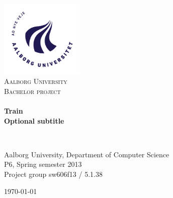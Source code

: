 \begin{titlingpage}
\begin{center}
\includegraphics[width=0.30\textwidth]{img/Titelblad/AAU_logo_2012}~\\[0.5cm]

\textsc{\LARGE Aalborg University}\\[0.5cm]

\textsc{\Large Bachelor project}\\[0.5cm]

\HRule \\[0.4cm]
{ \huge \bfseries Train}\\[0.4cm]
{ \bfseries Optional subtitle}

\HRule \\[0.5cm]

\begin{minipage}{\textwidth}
\begin{center}
	Aalborg University, Department of Computer Science\\
	P6, Spring semester 2013\\
	Project group sw606f13 / 5.1.38\\
\end{center}
\end{minipage}

\begin{figure}[H]
\end{figure}

\vfill



{\large \today}

\end{center}
\end{titlingpage}

